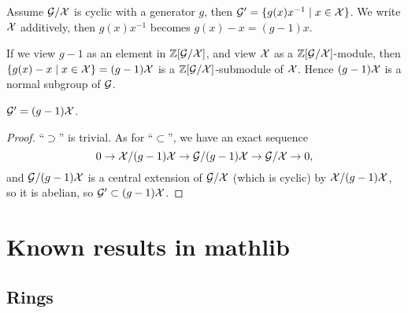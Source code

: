 Assume ${\mathcal {G}}/{\mathcal {X}}$ is cyclic with a generator $g$,
then ${\mathcal {G}}'=\{g(x)x^{-1}\mid x\in {\mathcal {X}}\}$.
We write ${\mathcal {X}}$ additively, then $g(x)x^{-1}$ becomes $g(x)-x=(g-1)x$.

If we view $g-1$ as an element in ${\mathbb {Z}}[{\mathcal {G}}/{\mathcal {X}}]$,
and view ${\mathcal {X}}$ as a ${\mathbb {Z}}[{\mathcal {G}}/{\mathcal {X}}]$-module,
then $\{g(x)-x\mid x\in {\mathcal {X}}\}=(g-1){\mathcal {X}}$ is
a ${\mathbb {Z}}[{\mathcal {G}}/{\mathcal {X}}]$-submodule of ${\mathcal {X}}$. Hence $(g-1){\mathcal {X}}$ is a normal subgroup of ${\mathcal {G}}$.

\begin{prop}\label{p:p-prime}
${\mathcal {G}}'=(g-1){\mathcal {X}}$.
\end{prop}
\begin{proof}
``$\supset$'' is trivial. As for ``$\subset$'',
we have an exact sequence
\[
0\rightarrow {\mathcal {X}}/{(g-1){\mathcal {X}}}\rightarrow{\mathcal {G}}/{(g-1){\mathcal {X}}}\rightarrow{\mathcal {G}}/{\mathcal {X}}\rightarrow 0,
\]
and ${\mathcal {G}}/(g-1){\mathcal {X}}$ is a central extension of ${\mathcal {G}}/{\mathcal {X}}$ (which is cyclic)
by ${\mathcal {X}}/{(g-1){\mathcal {X}}}$, so it is abelian, so ${\mathcal {G}}'\subset(g-1){\mathcal {X}}$.
\end{proof}

\appendix

\section{Known results in mathlib}

\subsection{Rings}

